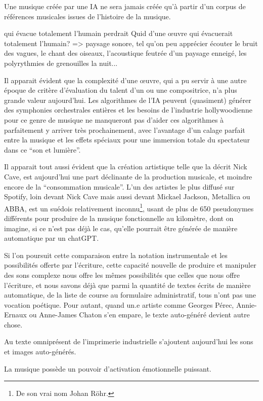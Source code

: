 Une musique créée par une IA ne sera jamais créée qu'à partir d'un corpus de références musicales issues de l'histoire de la musique.

qui évacue totalement l'humain perdrait 
Quid d'une œuvre qui évacuerait totalement l'humain?
=> paysage sonore, tel qu'on peu apprécier écouter le bruit des vagues, le chant des oiseaux, l'acoustique feutrée d'un paysage enneigé, les polyrythmies de grenouilles la nuit...


Il apparait évident que la complexité d'une œuvre, qui a pu servir à une autre époque de critère d'évaluation du talent d'un ou une compositrice, n'a plus grande valeur aujourd'hui. Les algorithmes de l'IA peuvent (quasiment) générer des symphonies orchestrales entières et les besoins de l'industrie hollywoodienne pour ce genre de musique ne manqueront pas d'aider ces algorithmes à parfaitement y arriver très prochainement, avec l'avantage d'un calage parfait entre la musique et les effets spéciaux pour une immersion totale du spectateur dans ce ``son et lumière''.

Il apparait tout aussi évident que la création artistique telle que la décrit Nick Cave, est aujourd'hui une part déclinante de la production musicale, et moindre encore de la ``consommation musicale''. L'un des artistes le plus diffusé sur Spotify, loin devant Nick Cave mais aussi devant Mickael Jackson, Metallica ou ABBA, est un suédois relativement inconnu\footnote{De son vrai nom Johan Röhr.}, usant de plus de 650 pseudonymes différents pour produire de la musique fonctionnelle au kilomètre, dont on imagine, si ce n'est pas déjà le cas, qu'elle pourrait être générée de manière automatique par un chatGPT.

Si l'on poursuit cette comparaison entre la notation instrumentale et les possibilités offerte par l'écriture, cette capacité nouvelle de produire et manipuler des sons complexe nous offre les mêmes possibilités que celles que nous offre l'écriture, et nous savons déjà que parmi la quantité de textes écrits de manière automatique, de la liste de course au formulaire administratif, tous n'ont pas une vocation poétique. Pour autant, quand un.e artiste comme Georges Pérec, Annie-Ernaux ou Anne-James Chaton s'en empare, le texte auto-généré devient autre chose.

Au texte omniprésent de l'imprimerie industrielle s'ajoutent aujourd'hui les sons et images auto-générés.

La musique possède un pouvoir d'activation émotionnelle puissant.

